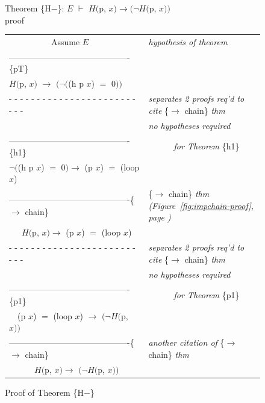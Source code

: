 \begin{figure}
Theorem \{H$-$\}: $E$ $\vdash$ $H($p, $x) \rightarrow(\neg H($p, $x))$~\\
proof
\begin{center}
\begin{tabular}{ll}
~~~~~~~~~~Assume $E$                                &\emph{hypothesis of theorem}\\
-------------------------------------------\{pT\}   &\\
$H($\textsf{p}, $x)$ $\rightarrow$ $(\neg($\textsf{(h p $x$)} $=$ 0$))$   &\\
 - - - - - - - - - - - - - - - - - - - - - - - - - -&\emph{separates 2 proofs req'd to cite} \{$\rightarrow$ chain\} \emph{thm}\\
                                                    &\emph{no hypotheses required}\\
-------------------------------------------\{h1\}   &~~~~~~\emph{for Theorem} \{h1\}\\
$\neg($\textsf{(h p $x$)} $=$ \textsf{0}$) \rightarrow$ \textsf{(p $x$)} $=$ \textsf{(loop $x$)}&\\
-------------------------------------------\{$\rightarrow$ chain\} &\{$\rightarrow$ chain\} \emph{thm (Figure~\ref{fig:impchain-proof}, page \pageref{fig:impchain-proof})}\\
~~~$H($\textsf{p}, $x) \rightarrow$ \textsf{(p $x$)} $=$ \textsf{(loop $x$)} &\\
 - - - - - - - - - - - - - - - - - - - - - - - - - -&\emph{separates 2 proofs req'd to cite} \{$\rightarrow$ chain\} \emph{thm}\\
                                                    &\emph{no hypotheses required}\\
-------------------------------------------\{p1\}   &~~~~~~\emph{for Theorem} \{p1\}\\
~~\textsf{(p $x$)} $=$ \textsf{(loop $x$)} $\rightarrow$ $(\neg H($\textsf{p}, $x))$ &\\
-------------------------------------------\{$\rightarrow$ chain\} &\emph{another citation of} \{$\rightarrow$ chain\} \emph{thm}\\
~~~~~~$H($\textsf{p}, $x) \rightarrow$ $(\neg H($\textsf{p}, $x))$  &\\
\end{tabular}
\end{center}
\caption{Proof of Theorem \{H$-$\}}
\label{fig:hminus-thm-proof}
\end{figure}

